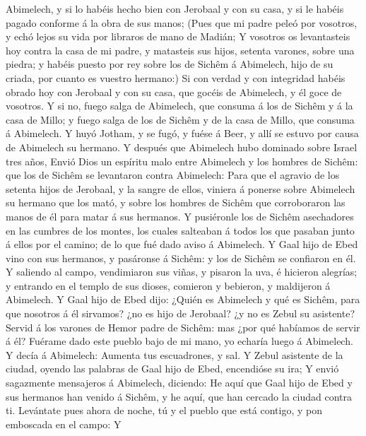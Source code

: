 Abimelech, y si lo habéis hecho bien con Jerobaal y con su casa, y si le
habéis pagado conforme á la obra de sus manos;  (Pues que
mi padre peleó por vosotros, y echó lejos su vida por libraros de mano
de Madián;  Y vosotros os levantasteis hoy contra la casa
de mi padre, y matasteis sus hijos, setenta varones, sobre una piedra; y
habéis puesto por rey sobre los de Sichêm á Abimelech, hijo de su
criada, por cuanto es vuestro hermano:)  Si con verdad y
con integridad habéis obrado hoy con Jerobaal y con su casa, que gocéis
de Abimelech, y él goce de vosotros.  Y si no, fuego salga
de Abimelech, que consuma á los de Sichêm y á la casa de Millo; y fuego
salga de los de Sichêm y de la casa de Millo, que consuma á Abimelech.
 Y huyó Jotham, y se fugó, y fuése á Beer, y allí se estuvo
por causa de Abimelech su hermano.  Y después que Abimelech
hubo dominado sobre Israel tres años,  Envió Dios un
espíritu malo entre Abimelech y los hombres de Sichêm: que los de Sichêm
se levantaron contra Abimelech:  Para que el agravio de los
setenta hijos de Jerobaal, y la sangre de ellos, viniera á ponerse sobre
Abimelech su hermano que los mató, y sobre los hombres de Sichêm que
corroboraron las manos de él para matar á sus hermanos.  Y
pusiéronle los de Sichêm asechadores en las cumbres de los montes, los
cuales salteaban á todos los que pasaban junto á ellos por el camino; de
lo que fué dado aviso á Abimelech.  Y Gaal hijo de Ebed
vino con sus hermanos, y pasáronse á Sichêm: y los de Sichêm se
confiaron en él.  Y saliendo al campo, vendimiaron sus
viñas, y pisaron la uva, é hicieron alegrías; y entrando en el templo de
sus dioses, comieron y bebieron, y maldijeron á Abimelech. 
Y Gaal hijo de Ebed dijo: ¿Quién es Abimelech y qué es Sichêm, para que
nosotros á él sirvamos? ¿no es hijo de Jerobaal? ¿y no es Zebul su
asistente? Servid á los varones de Hemor padre de Sichêm: mas ¿por qué
habíamos de servir á él?  Fuérame dado este pueblo bajo de
mi mano, yo echaría luego á Abimelech. Y decía á Abimelech: Aumenta tus
escuadrones, y sal.  Y Zebul asistente de la ciudad, oyendo
las palabras de Gaal hijo de Ebed, encendióse su ira;  Y
envió sagazmente mensajeros á Abimelech, diciendo: He aquí que Gaal hijo
de Ebed y sus hermanos han venido á Sichêm, y he aquí, que han cercado
la ciudad contra ti.  Levántate pues ahora de noche, tú y
el pueblo que está contigo, y pon emboscada en el campo:  Y
